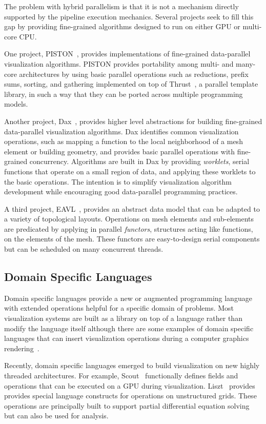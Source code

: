\documentclass[journal,twocolumn,10pt,letterpaper,twoside]{IEEEtran}
\newcommand*{\lcite}[1]{~\cite{#1}}
\newcommand*{\keyterm}[1]{\emph{#1}}
\begin{document}
The problem with hybrid parallelism is that it is not a mechanism directly
supported by the pipeline execution mechanics.  Several projects seek to
fill this gap by providing fine-grained algorithms designed to run on
either GPU or multi-core CPU.

One project, PISTON\lcite{PISTON}, provides implementations of fine-grained
data-parallel visualization algorithms.  PISTON provides portability among
multi- and many-core architectures by using basic parallel operations such
as reductions, prefix sums, sorting, and gathering implemented on top of
Thrust\lcite{Thrust}, a parallel template library, in such a way that they
can be ported across multiple programming models.

Another project, Dax\lcite{Moreland2011:LDAV}, provides higher level
abstractions for building fine-grained data-parallel visualization
algorithms.  Dax identifies common visualization operations, such as
mapping a function to the local neighborhood of a mesh element or building
geometry, and provides basic parallel operations with fine-grained
concurrency.  Algorithms are built in Dax by providing \keyterm{worklets},
serial functions that operate on a small region of data, and applying these
worklets to the basic operations.  The intention is to simplify
visualization algorithm development while encouraging good data-parallel
programming practices.

A third project, EAVL\lcite{EAVL}, provides an abstract data model that can
be adapted to a variety of topological layouts.  Operations on mesh
elements and sub-elements are predicated by applying in parallel
\keyterm{functors}, structures acting like functions, on the elements of
the mesh.  These functors are easy-to-design serial components but can be
scheduled on many concurrent threads.

\subsection{Domain Specific Languages}

Domain specific languages provide a new or augmented programming language
with extended operations helpful for a specific domain of problems.  Most
visualization systems are built as a library on top of a language rather
than modify the language itself although there are some examples of domain
specific languages that can insert visualization operations during a
computer graphics rendering\lcite{Corrie1993,Crawfis1991}.

Recently, domain specific languages emerged to build visualization on new
highly threaded architectures.  For example, Scout\lcite{Scout}
functionally defines fields and operations that can be executed on a GPU
during visualization.  Liszt\lcite{Liszt} provides provides special
language constructs for operations on unstructured grids.  These operations
are principally built to support partial differential equation solving but
can also be used for analysis.
\end{document}
